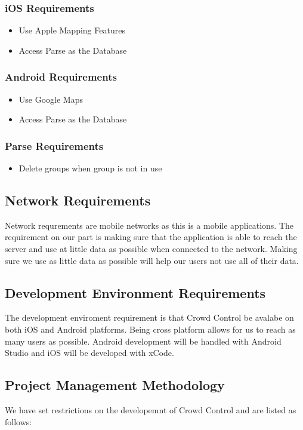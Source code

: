 \subsubsection{iOS Requirements}
\begin{itemize}
\item{Use Apple Mapping Features}
\item{Access Parse as the Database}
\end{itemize}
\subsubsection{Android Requirements}
\begin{itemize}
\item{Use Google Maps}
\item{Access Parse as the Database}
\end{itemize}
\subsubsection{Parse Requirements}
\begin{itemize}
\item{Delete groups when group is not in use}
\end{itemize}


\subsection{Network Requirements}
Network requrements are mobile networks as this is a mobile applications. The requirement on our part is making sure that the application is able to reach the server and use at little data as possible when connected to the network. Making sure we use as little data as possible will help our users not use all of their data. 


\subsection{Development Environment Requirements}
The development enviroment requirement is that Crowd Control be avalabe on both iOS and Android platforms. Being cross platform allows for us to reach as many users as possible. Android development will be handled with Android Studio and iOS will be developed with xCode.


\subsection{Project  Management Methodology}
We have set restrictions on the developemnt of Crowd Control and are listed as follows:
 
